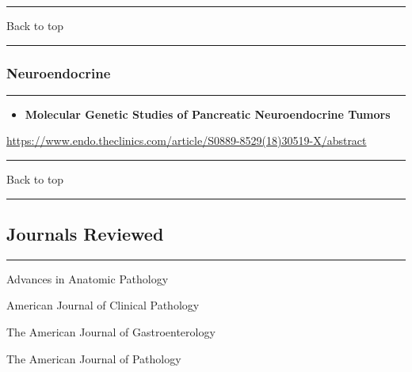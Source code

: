 \documentclass[]{article}
\providecommand{\tightlist}{%
  \setlength{\itemsep}{0pt}\setlength{\parskip}{0pt}}
\begin{document}
{}

\begin{center}\rule{0.5\linewidth}{\linethickness}\end{center}

Back to top

\begin{center}\rule{0.5\linewidth}{\linethickness}\end{center}

\pagebreak

\hypertarget{neuroendocrine-2}{%
\subsubsection{Neuroendocrine}\label{neuroendocrine-2}}

\begin{center}\rule{0.5\linewidth}{\linethickness}\end{center}

\begin{itemize}
\tightlist
\item
  \textbf{Molecular Genetic Studies of Pancreatic Neuroendocrine Tumors}
\end{itemize}

\url{https://www.endo.theclinics.com/article/S0889-8529(18)30519-X/abstract}

\begin{center}\rule{0.5\linewidth}{\linethickness}\end{center}

Back to top

\begin{center}\rule{0.5\linewidth}{\linethickness}\end{center}

\pagebreak

\hypertarget{journals-reviewed}{%
\subsection{Journals Reviewed}\label{journals-reviewed}}

\begin{center}\rule{0.5\linewidth}{\linethickness}\end{center}

Advances in Anatomic Pathology

American Journal of Clinical Pathology

The American Journal of Gastroenterology

The American Journal of Pathology
\end{document}

